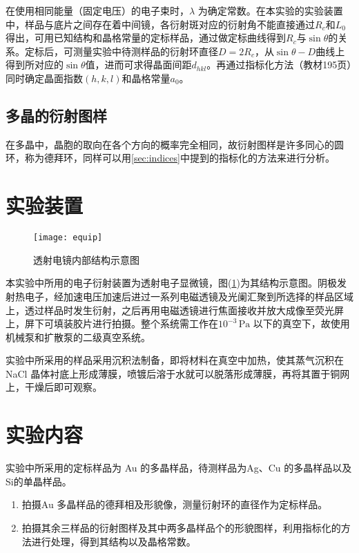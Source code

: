 \documentclass[aps,pre,12pt,preprint,onecolumn,showpacs,showkeys]{revtex4-1}
\begin{document}
        在使用相同能量（固定电压）的电子束时，$\lambda$ 为确定常数。在本实验的实验装置中，样品与底片之间存在着中间镜，各衍射斑对应的衍射角不能直接通过$R_c$和$L_0$得出，可用已知结构和晶格常量的定标样品，通过做定标曲线得到$R_c$与$\sin \theta$的关系。定标后，可测量实验中待测样品的衍射环直径$D=2R_c$，从$\sin \theta - D$曲线上得到所对应的$\sin \theta $值，进而可求得晶面间距$d_{hkl}$。再通过指标化方法（教材195页）同时确定晶面指数$(h,k,l)$和晶格常量$a_0$。
    \subsection{多晶的衍射图样}
        在多晶中，晶胞的取向在各个方向的概率完全相同，故衍射图样是许多同心的圆环，称为德拜环，同样可以用\ref{sec:indices}中提到的指标化的方法来进行分析。
\section{实验装置}
    \begin{figure}[ht]
	\centering
	\texttt{[image: equip]}
	\caption{\label{fig:equip}%
	透射电镜内部结构示意图}
	\end{figure}
    本实验中所用的电子衍射装置为透射电子显微镜，图(\ref{fig:equip})为其结构示意图。阴极发射热电子，经加速电压加速后进过一系列电磁透镜及光阑汇聚到所选择的样品区域上，透过样品时发生衍射，之后再用电磁透镜进行焦面接收并放大成像至荧光屏上，屏下可填装胶片进行拍摄。整个系统需工作在$10^{−3}\,\mathrm{Pa}$ 以下的真空下，故使用机械泵和扩散泵的二级真空系统。

    实验中所采用的样品采用沉积法制备，即将材料在真空中加热，使其蒸气沉积在NaCl 晶体衬底上形成薄膜，喷镀后溶于水就可以脱落形成薄膜，再将其置于铜网上，干燥后即可观察。

\section{实验内容}
    实验中所采用的定标样品为 Au 的多晶样品，待测样品为Ag、Cu 的多晶样品以及Si的单晶样品。
    \begin{enumerate}
        \item 拍摄Au 多晶样品的德拜相及形貌像，测量衍射环的直径作为定标样品。
        \item 拍摄其余三样品的衍射图样及其中两多晶样品个的形貌图样，利用指标化的方法进行处理，得到其结构以及晶格常数。
    \end{enumerate}
\end{document}
